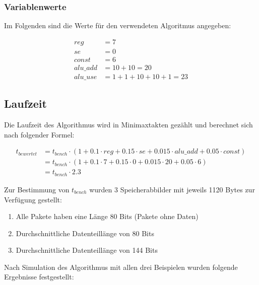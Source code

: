 \subsubsection{Variablenwerte}
\label{subsubsection:Dokumentation-BenchmarkBewertung-Berechnung-Variablen-Variablenwerte}


Im Folgenden sind die Werte für den verwendeten Algoritmus angegeben:

\begin{align*}
    reg      &= 7 \\
    se       &= 0 \\
    const    &= 6 \\
    alu\_add &= 10 + 10 = 20 \\
    alu\_use &= 1 + 1 + 10 + 10 + 1 = 23
\end{align*}

\subsection{Laufzeit}
\label{subsection:Dokumentation-BenchmarkBewertung-Berechnung-Laufzeit}

Die Laufzeit des Algorithmus wird in Minimaxtakten gezählt und berechnet sich nach folgender Formel:

\begin{align*}
    t_{bewertet} &= t_{bench} \cdot (1 + 0.1 \cdot reg + 0.15 \cdot se + 0.015 \cdot alu\_add + 0.05 \cdot const) \\
                 &= t_{bench} \cdot (1 + 0.1 \cdot 7 + 0.15 \cdot 0 + 0.015 \cdot 20 + 0.05 \cdot 6) \\
                 &= t_{bench} \cdot 2.3
\end{align*}

Zur Bestimmung von $t_{bench}$ wurden 3 Speicherabbilder mit jeweils 1120 Bytes zur Verfügung gestellt:

\begin{enumerate}
    \item Alle Pakete haben eine Länge 80 Bits (Pakete ohne Daten)
    \item Durchschnittliche Datenteillänge von 80 Bits
    \item Durchschnittliche Datenteillänge von 144 Bits
\end{enumerate}

Nach Simulation des Algorithmus mit allen drei Beispielen wurden folgende Ergebnisse festgestellt: 

